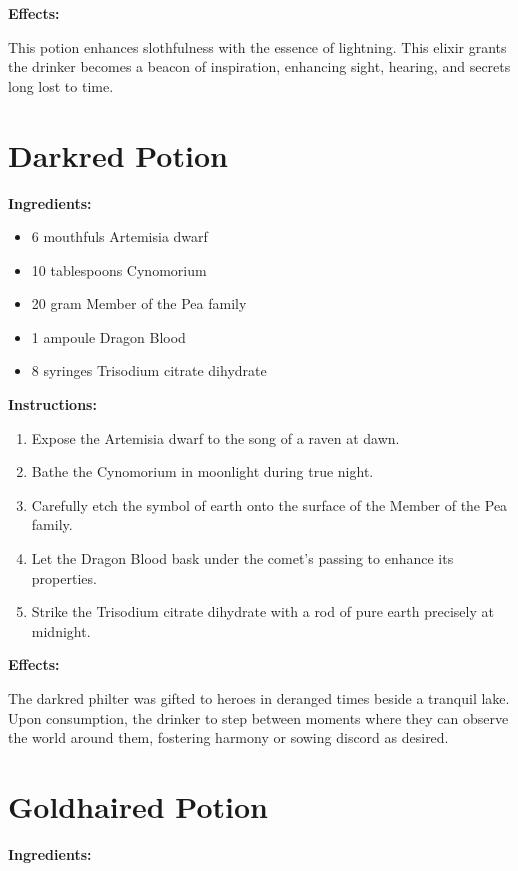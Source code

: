 \documentclass{article}
\begin{document}
\textbf{Effects:}

This potion enhances slothfulness with the essence of lightning. This elixir grants the drinker becomes a beacon of inspiration, enhancing sight, hearing, and secrets long lost to time.

\newpage
\section*{Darkred Potion}

\textbf{Ingredients:}

\begin{itemize}
  \item 6 mouthfuls Artemisia dwarf
  \item 10 tablespoons Cynomorium
  \item 20 gram Member of the Pea family
  \item 1 ampoule Dragon Blood
  \item 8 syringes Trisodium citrate dihydrate
\end{itemize}

\textbf{Instructions:}

\begin{enumerate}
  \item Expose the Artemisia dwarf to the song of a raven at dawn.
  \item Bathe the Cynomorium in moonlight during true night.
  \item Carefully etch the symbol of earth onto the surface of the Member of the Pea family.
  \item Let the Dragon Blood bask under the comet’s passing to enhance its properties.
  \item Strike the Trisodium citrate dihydrate with a rod of pure earth precisely at midnight.
\end{enumerate}

\textbf{Effects:}

The darkred philter was gifted to heroes in deranged times beside a tranquil lake. Upon consumption, the drinker to step between moments where they can observe the world around them, fostering harmony or sowing discord as desired.

\newpage
\section*{Goldhaired Potion}

\textbf{Ingredients:}
\end{document}
